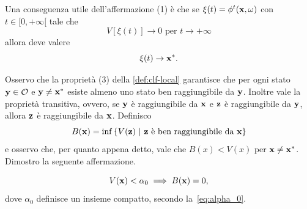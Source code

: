 \begin{steps}
    Una conseguenza utile dell'affermazione (1) è che se
    $\xi(t) = \phi^t(\mathbf{x}, \omega)$ con $t \in [0, +\infty[$ tale che
    \begin{equation*}
        V[\xi(t)] \to 0 \text{ per } t \to +\infty
    \end{equation*}
    allora deve valere
    \begin{equation}
        \xi(t) \to \mathbf{x}^*.
        \label{eq:xi-to-xstar}
    \end{equation}


    \item Osservo che la proprietà (3) della \autoref{def:clf-local}
    garantisce che per ogni stato $\mathbf{y} \in \mathcal O$ e $\mathbf{y} \neq \mathbf{x}^*$ esiste
    almeno uno stato ben raggiungibile da $\mathbf{y}$.
    Inoltre vale la proprietà transitiva, ovvero, se $\mathbf{y}$ è raggiungibile da $\mathbf{x}$
    e $\mathbf{z}$ è raggiungibile da $\mathbf{y}$, allora $\mathbf{z}$ è raggiungibile da $\mathbf{x}$.
    Definisco
    \begin{equation*}
        B(\mathbf{x}) = \inf\left\{ V(\mathbf{z})\ |\ \mathbf{z} \text{ è ben raggiungibile da } \mathbf{x} \right\}
    \end{equation*}
    e osservo che, per quanto appena detto, vale che $B(x) < V(x)$ per $\mathbf{x} \neq \mathbf{x}^*$.
    Dimostro la seguente affermazione.

    \begin{aff}
        \begin{equation*}
            V(\mathbf{x}) < \alpha_0 \implies B(\mathbf{x}) = 0,
        \end{equation*}
        dove $\alpha_0$ definisce un insieme compatto, secondo la~\eqref{eq:alpha_0}.
    \end{aff}


\end{steps}
